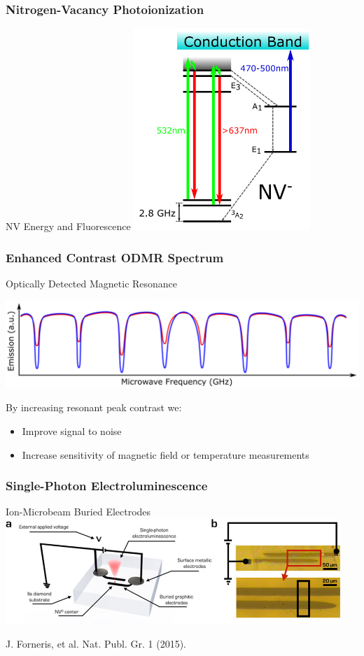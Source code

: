 \documentclass{beamer}
\begin{document}
\begin{frame}\frametitle{Nitrogen-Vacancy Photoionization}
    \begin{block}{NV Energy and Fluorescence}
        \centering
        \includegraphics[width=0.5\textwidth]{Images/IonizationEnergyandFilter.png}
    \end{block}
\end{frame}

\begin{frame}\frametitle{Enhanced Contrast ODMR Spectrum}
    \begin{block}{Optically Detected Magnetic Resonance}
        \begin{center}
        \includegraphics[width=1.0\textwidth]{Images/ODMR.png}
        \end{center}
        By increasing resonant peak contrast we:
        \begin{itemize}
            \item Improve signal to noise
            \item Increase sensitivity of magnetic field or temperature measurements
        \end{itemize}
    \end{block}
\end{frame}

\begin{frame}\frametitle{Single-Photon Electroluminescence}
    \begin{block}{Ion-Microbeam Buried Electrodes}
        \centering
        \includegraphics[width=0.95\textwidth]{Images/Electrolumin.jpg}

        J. Forneris, et al. Nat. Publ. Gr. 1 (2015).
    \end{block}
\end{frame}
\end{document}
